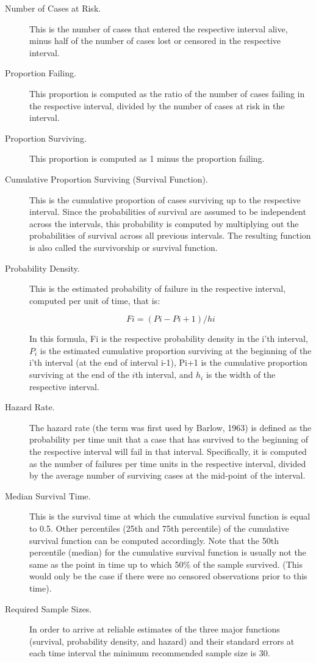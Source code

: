 \documentclass[11pt]{article} %
\begin{document}
\begin{description}
\item[Number of Cases at Risk.] This is the number of cases that entered the respective interval alive, minus half of the number of cases lost or censored in the respective interval.

\item[Proportion Failing.] This proportion is computed as the ratio of the number of cases failing in the respective interval, divided by the number of cases at risk in the interval.

\item[Proportion Surviving.] This proportion is computed as 1 minus the proportion failing.

\item[Cumulative Proportion Surviving (Survival Function).] This is the cumulative proportion of cases surviving up to the respective interval. Since the probabilities of survival are assumed to be independent across the intervals, this probability is computed by multiplying out the probabilities of survival across all previous intervals. The resulting function is also called the survivorship or survival function.

\item[Probability Density.] This is the estimated probability of failure in the respective interval, computed per unit of time, that is:

\[Fi = (Pi-Pi+1) /hi\]

In this formula, Fi is the respective probability density in the i'th interval, $P_i$ is the estimated cumulative proportion surviving at the beginning of the i'th interval (at the end of interval i-1), Pi+1 is the cumulative proportion surviving at the end of the $i$th interval, and $h_i$
 is the width of the respective interval.

\item[Hazard Rate.] The hazard rate (the term was first used by Barlow, 1963) is defined as the probability per time unit that a case that has survived to the beginning of the respective interval will fail in that interval. Specifically, it is computed as the number of failures per time units in the respective interval, divided by the average number of surviving cases at the mid-point of the interval.

\item[Median Survival Time.] This is the survival time at which the cumulative survival function is equal to 0.5. Other percentiles (25th and 75th percentile) of the cumulative survival function can be computed accordingly. Note that the 50th percentile (median) for the cumulative survival function is usually not the same as the point in time up to which 50\% of the sample survived. (This would only be the case if there were no censored observations prior to this time).

\item[Required Sample Sizes.] In order to arrive at reliable estimates of the three major functions (survival, probability density, and hazard) and their standard errors at each time interval the minimum recommended sample size is 30.

\end{description}
\end{document}
